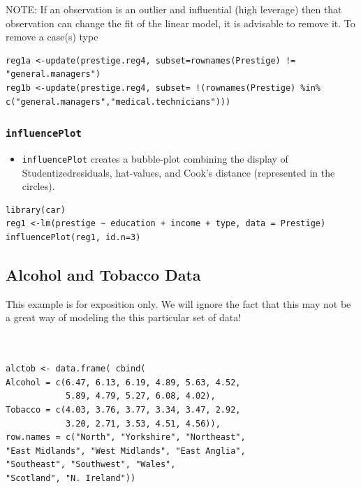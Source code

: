 \documentclass[residuals.tex]{subfiles}
\begin{document}
NOTE: If an observation is an outlier and influential (high leverage) then that observation can change the fit of the linear model, it is advisable to remove it. To remove a case(s) type
\begin{verbatim}
reg1a <-update(prestige.reg4, subset=rownames(Prestige) != "general.managers")
reg1b <-update(prestige.reg4, subset= !(rownames(Prestige) %in% c("general.managers","medical.technicians")))
\end{verbatim}

\subsubsection*{\texttt{influencePlot}}
\begin{itemize}
\item \texttt{influencePlot} creates a bubble-plot combining the display of Studentizedresiduals, hat-values, and Cook's distance (represented in the circles).
\end{itemize}
\begin{framed}
\begin{verbatim}
library(car)
reg1 <-lm(prestige ~ education + income + type, data = Prestige)
influencePlot(reg1, id.n=3)
\end{verbatim}
\end{framed}
\newpage
\subsection{Alcohol and Tobacco Data}
This example is for exposition only. We will ignore the fact that this may not be a great way of modeling the this particular set of data!


\begin{framed}
\begin{verbatim}


alctob <- data.frame( cbind(
Alcohol = c(6.47, 6.13, 6.19, 4.89, 5.63, 4.52, 
            5.89, 4.79, 5.27, 6.08, 4.02),
Tobacco = c(4.03, 3.76, 3.77, 3.34, 3.47, 2.92, 
            3.20, 2.71, 3.53, 4.51, 4.56)),
row.names = c("North", "Yorkshire", "Northeast", 
"East Midlands", "West Midlands", "East Anglia", 
"Southeast", "Southwest", "Wales", 
"Scotland", "N. Ireland"))


\end{verbatim}
\end{framed}

\end{document}
